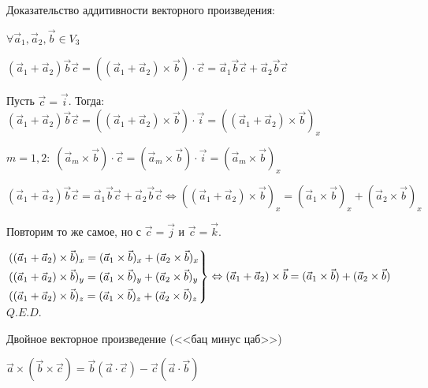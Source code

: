 Доказательство аддитивности векторного произведения:

\(\forall \vec a_1, \vec a_2, \vec b \in V_3\)

\((\vec a_1 + \vec a_2)\vec b \vec c = ((\vec a_1 + \vec a_2) \times \vec b) \cdot \vec c = \vec a_1 \vec b \vec c + \vec a_2 \vec b \vec c\)

Пусть \(\vec c = \vec i\). Тогда: \((\vec a_1 + \vec a_2)\vec b \vec c = ((\vec a_1 + \vec a_2) \times \vec b) \cdot \vec i = ((\vec a_1 + \vec a_2) \times \vec b)_x\)

\(m = 1, 2:\; (\vec a_m \times \vec b) \cdot \vec c = (\vec a_m \times \vec b) \cdot \vec i = (\vec a_m \times \vec b)_x\)

\((\vec a_1 + \vec a_2)\vec b \vec c = \vec a_1 \vec b \vec c + \vec a_2 \vec b \vec c \Leftrightarrow ((\vec a_1 + \vec a_2) \times \vec b)_x = (\vec a_1 \times \vec b)_x + (\vec a_2 \times \vec b)_x\)

Повторим то же самое, но с \(\vec c = \vec j\) и \(\vec c = \vec k\).

\(\begin{rcases}
    ((\vec a_1 + \vec a_2) \times \vec b)_x = (\vec a_1 \times \vec b)_x + (\vec a_2 \times \vec b)_x \\
    ((\vec a_1 + \vec a_2) \times \vec b)_y = (\vec a_1 \times \vec b)_y + (\vec a_2 \times \vec b)_y \\
    ((\vec a_1 + \vec a_2) \times \vec b)_z = (\vec a_1 \times \vec b)_z + (\vec a_2 \times \vec b)_z
\end{rcases} \Leftrightarrow (\vec a_1 + \vec a_2) \times \vec b = (\vec a_1 \times \vec b) + (\vec a_2 \times \vec b)\) \(Q.E.D.\)

Двойное векторное произведение (<<бац минус цаб>>)

\(\vec a \times (\vec b \times \vec c) = \vec b(\vec a \cdot \vec c) - \vec c(\vec a \cdot \vec b)\)

